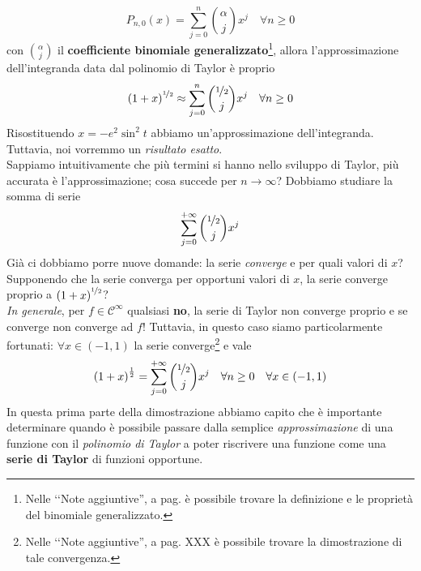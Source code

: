 \begin{equation*}
	P_{n,0}\left(x\right)=\sum_{j=0}^{n}\binom{\alpha}{j}x^j\quad\forall n\geq 0
\end{equation*}
con $\displaystyle\binom{\alpha}{j}$ il \textbf{coefficiente binomiale generalizzato}\footnote{Nelle ‘‘Note aggiuntive'', a pag. \pageref{coefficientebinomialgeneralizzato} è possibile trovare la definizione e le proprietà del binomiale generalizzato.}, allora l'approssimazione dell'integranda data dal polinomio di Taylor è proprio
\begin{equation*}
	\left(1+x\right)^{\nicefrac{1}{2}}\approx\sum_{j=0}^{n}\binom{\nicefrac{1}{2}}{j}x^j\quad\forall n\geq 0
\end{equation*}
Risostituendo $x=-e^2\sin^2t$ abbiamo un'approssimazione dell'integranda. Tuttavia, noi vorremmo un \textit{risultato esatto}.\\
Sappiamo intuitivamente che più termini si hanno nello sviluppo di Taylor, più accurata è l'approssimazione; cosa succede per $n\to\infty$? Dobbiamo studiare la somma di serie
\begin{equation*}
	\sum_{j=0}^{+\infty}\binom{\nicefrac{1}{2}}{j}x^j
\end{equation*}
Già ci dobbiamo porre nuove domande: la serie \textit{converge} e per quali valori di $x$? Supponendo che la serie converga per opportuni valori di $x$, la serie converge proprio a $\left(1+x\right)^{\nicefrac{1}{2}}$?\\
\textit{In generale}, per $f\in\mathcal{C}^\infty$ qualsiasi \textbf{no}, la serie di Taylor non converge proprio e se converge non converge ad $f$! Tuttavia, in questo caso siamo particolarmente fortunati: $\forall x\in \left(-1, 1\right)$ la serie converge\footnote{Nelle ‘‘Note aggiuntive'', a pag. XXX è possibile trovare la dimostrazione di tale convergenza.} e vale
\begin{equation*}
	\left(1+x\right)^{\frac{1}{2}}=\sum_{j=0}^{+\infty}\binom{\nicefrac{1}{2}}{j}x^j\quad\forall n\geq 0\quad \forall x\in\left(-1, 1\right)
\end{equation*}
In questa prima parte della dimostrazione abbiamo capito che è importante determinare quando è possibile passare dalla semplice \textit{approssimazione} di una funzione con il \textit{polinomio di Taylor} a poter riscrivere una funzione come una \textbf{serie di Taylor} di funzioni opportune.
